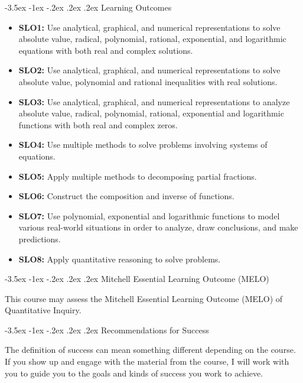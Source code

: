\documentclass{article}
\makeatletter
\renewcommand\section{\@startsection{section}{1}{0pt}%
  {-3.5ex \@plus -1ex \@minus -.2ex}%
  {.2ex \@plus.2ex}%
  {\normalfont\Large\bfseries}} %
\makeatother
\begin{document}
\section{Learning Outcomes}

\begin{itemize}
\item \textbf{SLO1:} Use analytical, graphical, and numerical representations to solve absolute value, radical, polynomial, rational, exponential, and logarithmic equations with both real and complex solutions.
\item \textbf{SLO2:} Use analytical, graphical, and numerical representations to solve absolute value, polynomial and rational inequalities with real solutions.
\item \textbf{SLO3:} Use analytical, graphical, and numerical representations to analyze absolute value, radical, polynomial, rational, exponential and logarithmic functions with both real and complex zeros.
\item \textbf{SLO4:} Use multiple methods to solve problems involving systems of equations.
\item \textbf{SLO5:} Apply multiple methods to decomposing partial fractions.
\item \textbf{SLO6:} Construct the composition and inverse of functions.
\item \textbf{SLO7:} Use polynomial, exponential and logarithmic functions to model various real-world situations in order to analyze, draw conclusions, and make predictions.
\item \textbf{SLO8:} Apply quantitative reasoning to solve problems.
\end{itemize}

\section{Mitchell Essential Learning Outcome (MELO)}

This course may assess the Mitchell Essential Learning Outcome (MELO) of Quantitative Inquiry.

\section{Recommendations for Success}

The definition of success can mean something different depending on the course. If you show up and engage with the material from the course, I will work with you to guide you to the goals and kinds of success you work to achieve.
\end{document}

